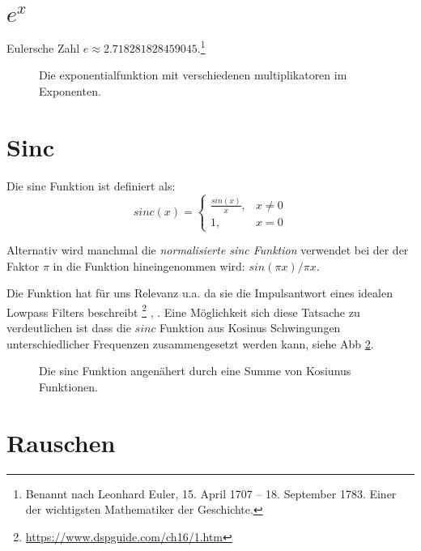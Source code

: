 \section{$e^x$}
Eulersche Zahl $e \approx 2.718281828459045$.\footnote{Benannt nach Leonhard Euler, 15. April 1707 – 18. September 1783. Einer der wichtigsten Mathematiker der Geschichte. }

\begin{figure}[H]
	\centering
	
	\caption{Die exponentialfunktion mit verschiedenen multiplikatoren im Exponenten.}
	\label{fig:expVersions}
\end{figure}



\section{Sinc}

Die sinc Funktion ist definiert als:
\begin{equation}
 sinc (x)={\begin{cases} \frac{sin(x)}{x} ,&x\neq 0\\{1},&x=0\end{cases}}
\end{equation}

Alternativ wird manchmal die \emph{normalisierte sinc Funktion} verwendet bei der der Faktor $\pi$ in die Funktion hineingenommen wird: $sin(\pi x) / \pi x$.

Die Funktion hat für uns Relevanz u.a. da sie die Impulsantwort eines idealen Lowpass Filters beschreibt \citep{smith1997scientist}\footnote{\href{https://www.dspguide.com/ch16/1.htm}{https://www.dspguide.com/ch16/1.htm}} , \citep{enwiki:sincFilter}. Eine Möglichkeit sich diese Tatsache zu verdeutlichen ist dass die $sinc$ Funktion aus Kosinus Schwingungen unterschiedlicher Frequenzen zusammengesetzt werden kann, siehe Abb \ref{fig:sincAsSum}. 



\begin{figure}[H]
	\centering
	
	\caption{Die sinc Funktion angenähert durch eine Summe von Kosiunus Funktionen.}
	\label{fig:sincAsSum}
\end{figure}

\section{Rauschen}
